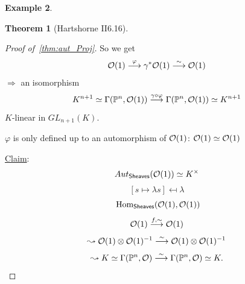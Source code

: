 \documentclass[11pt]{article}
\theoremstyle{definition}
\newtheorem{thm}{Theorem}[section]
\newtheorem{ex}[thm]{Example}
\renewcommand{\hom}{\text{ Hom}}
\newcommand{\proj}{\mathbb P}
\newcommand{\calo}{{\cal O}}
\newcommand{\Lrta}{\Longrightarrow}
\newcommand{\lrta}{\longrightarrow}
\begin{document}
\begin{ex}
\begin{enumerate}[label=\boxed{\arabic*}]
\begin{thm}[Hartshorne II6.16]
\begin{proof}[Proof of~\ref{thm:aut_Proj}]
So we get 
$$
\calo(1)\overset{\varphi}{\lrta}\gamma^*\calo(1)\overset{\sim}{\lrta}\calo(1)
$$
$\Lrta$ an isomorphism
$$
K^{n+1}\simeq\Gamma(\proj^n,\calo(1))\overset{\gamma\circ \varphi}{\lrta}\Gamma(\proj^n,\calo(1))\simeq K^{n+1}
$$
$K$-linear in $GL_{n+1}(K)$. 

$\varphi$ is only defined up to an automorphism of $\calo(1)$:
$\calo(1)\simeq\calo(1)$

\underline{Claim}: 
$$
Aut_{\mathsf{Sheaves}}(\calo(1))\simeq K^{\times}
$$
$$
[s\mapsto \lambda s]\mapsfrom \lambda
$$
$$
\hom_{\mathsf{Sheaves}}(\calo(1),\calo(1))
$$
$$
\calo(1)\overset{f,\sim}{\lrta}\calo(1)
$$
$$
\leadsto \calo(1)\otimes\calo(1)^{-1}\overset{\sim}{\lrta}\calo(1)\otimes\calo(1)
^{-1}
$$
$$
\leadsto
K\simeq \Gamma(\proj^n,\calo)\overset{\sim}{\lrta}\Gamma(\proj^n,\calo)\simeq K.
$$
\end{proof}

\end{thm}
\end{enumerate}
\end{ex}
\end{document}

